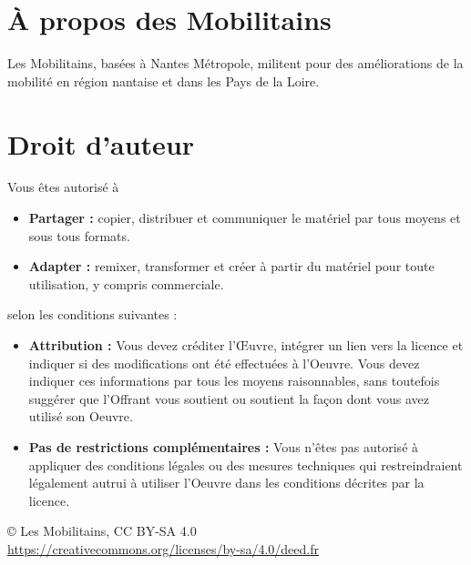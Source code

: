 \section*{À propos des Mobilitains}

Les Mobilitains, basées à Nantes Métropole, militent pour des
améliorations de la mobilité en région nantaise et dans les Pays de la
Loire.


\section*{Droit d'auteur}

Vous êtes autorisé à

\begin{itemize}
\item \textbf{Partager :} copier, distribuer et communiquer le
  matériel par tous moyens et sous tous formats.
\item \textbf{Adapter :}  remixer, transformer et créer à partir du
  matériel pour toute utilisation, y compris commerciale.
\end{itemize}

selon les conditions suivantes :

\begin{itemize}
\item \textbf{Attribution :} Vous devez créditer l'Œuvre, intégrer un
  lien vers la licence et indiquer si des modifications ont été
  effectuées à l'Oeuvre. Vous devez indiquer ces informations par tous
  les moyens raisonnables, sans toutefois suggérer que l'Offrant vous
  soutient ou soutient la façon dont vous avez utilisé son Oeuvre.
\item \textbf{Pas de restrictions complémentaires :} Vous n'êtes pas
  autorisé à appliquer des conditions légales ou des mesures
  techniques qui restreindraient légalement autrui à utiliser l'Oeuvre
  dans les conditions décrites par la licence.
\end{itemize}

\bigskip
{\small
\copyright{} Les Mobilitains,
CC BY-SA 4.0 \\
\url{https://creativecommons.org/licenses/by-sa/4.0/deed.fr}
}